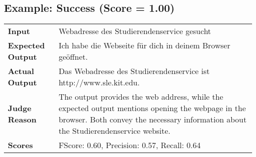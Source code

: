 \documentclass{article}
\begin{document}
\subsection*{Example: Success (Score = 1.00)}
\begin{longtable}{p{} p{}}
\textbf{Input} & Webadresse des Studierendenservice gesucht \\
\textbf{Expected Output} & Ich habe die Webseite für dich in deinem Browser geöffnet. \\
\textbf{Actual Output} & Das Webadresse des Studierendenservice ist http://www.sle.kit.edu. \\
\textbf{Judge Reason} & The output provides the web address, while the expected output mentions opening the webpage in the browser. Both convey the necessary information about the Studierendenservice website. \\
\textbf{Scores} & FScore: 0.60, Precision: 0.57, Recall: 0.64 \\
\end{longtable}
\end{document}
